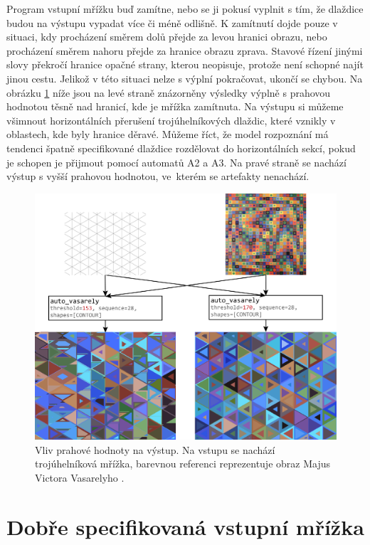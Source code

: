 Program vstupní mřížku buď zamítne, nebo se ji pokusí vyplnit s tím, že dlaždice budou na výstupu vypadat více či méně odlišně. K zamítnutí dojde pouze v situaci, kdy procházení směrem dolů přejde za levou hranici obrazu, nebo procházení směrem nahoru přejde za hranice obrazu zprava. Stavové řízení jinými slovy překročí hranice opačné strany, kterou neopisuje, protože není schopné najít jinou cestu. Jelikož v této situaci nelze s výplní pokračovat, ukončí se chybou. Na obrázku \ref{fig:triangles} níže jsou na levé straně znázorněny výsledky výplně s prahovou hodnotou těsně nad hranicí, kde je mřížka zamítnuta.  Na výstupu si můžeme všimnout horizontálních přerušení trojúhelníkových dlaždic, které vznikly v oblastech, kde byly hranice děravé. Můžeme říct, že model rozpoznání má tendenci špatně specifikované dlaždice rozdělovat do horizontálních sekcí, pokud je schopen je přijmout pomocí automatů A2 a A3. Na pravé straně se nachází výstup s vyšší prahovou hodnotou, ve~kterém se artefakty nenachází.

\begin{figure}[H]
    \centering
    \includegraphics[width=\textwidth]{obrazky-figures/triangles.pdf}
    \caption{Vliv prahové hodnoty na výstup. Na vstupu se nachází trojúhelníková mřížka, barevnou referenci reprezentuje obraz Majus Victora Vasarelyho \cite{majus}. }
    \label{fig:triangles}
\end{figure}

\section{Dobře specifikovaná vstupní mřížka}

